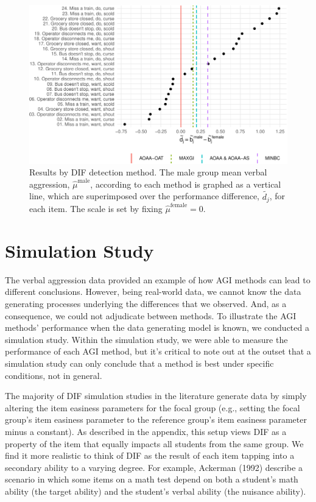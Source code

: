 \documentclass[
  english,
  man,floatsintext]{apa6}
\begin{document}
\begin{figure}[h]

{\centering \includegraphics{paper_apa_files/figure-latex/summary-1} 

}

\caption{Results by DIF detection method. The male group mean verbal aggression, $\hat \mu^\text{male}$, according to each method is graphed as a vertical line, which are superimposed over the performance difference, $\tilde {d_j}$, for each item. The scale is set by fixing $\hat \mu^\text{female} = 0$.}\label{fig:summary}
\end{figure}

\hypertarget{simulation-study}{%
\section{Simulation Study}\label{simulation-study}}

The verbal aggression data provided an example of how AGI methods can lead to different conclusions. However, being real-world data, we cannot know the data generating processes underlying the differences that we observed. And, as a consequence, we could not adjudicate between methods. To illustrate the AGI methods' performance when the data generating model is known, we conducted a simulation study. Within the simulation study, we were able to measure the performance of each AGI method, but it's critical to note out at the outset that a simulation study can only conclude that a method is best under specific conditions, not in general.

The majority of DIF simulation studies in the literature generate data by simply altering the item easiness parameters for the focal group (e.g., setting the focal group's item easiness parameter to the reference group's item easiness parameter minus a constant). As described in the appendix, this setup views DIF as a property of the item that equally impacts all students from the same group. We find it more realistic to think of DIF as the result of each item tapping into a secondary ability to a varying degree. For example, Ackerman (1992) describe a scenario in which some items on a math test depend on both a student's math ability (the target ability) and the student's verbal ability (the nuisance ability).
\end{document}
